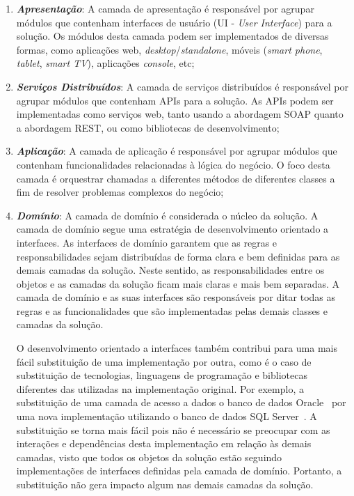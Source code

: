 \begin{enumerate}

  \item
  \textit{\textbf{Apresentação}}: A camada de apresentação é responsável por agrupar módulos que contenham interfaces de usuário (UI - \textit{User Interface}) para a solução. Os módulos desta camada podem ser implementados de diversas formas, como aplicações web, \textit{desktop}/\textit{standalone}, móveis (\textit{smart phone}, \textit{tablet}, \textit{smart TV}), aplicações \textit{console}, etc;
  
  \item
  \textit{\textbf{Serviços Distribuídos}}: A camada de serviços distribuídos é responsável por agrupar módulos que contenham APIs para a solução. As APIs podem ser implementadas como serviços web, tanto usando a abordagem SOAP quanto a abordagem REST, ou como bibliotecas de desenvolvimento;
  
  \item
  \textit{\textbf{Aplicação}}: A camada de aplicação é responsável por agrupar módulos que contenham funcionalidades relacionadas à lógica do negócio. O foco desta camada é orquestrar chamadas a diferentes métodos de diferentes classes a fim de resolver problemas complexos do negócio;
  
  \item
  \textit{\textbf{Domínio}}: A camada de domínio é considerada o núcleo da solução. A camada de domínio segue uma estratégia de desenvolvimento orientado a interfaces. As interfaces de domínio garantem que as regras e responsabilidades sejam distribuídas de forma clara e bem definidas para as demais camadas da solução. Neste sentido, as responsabilidades entre os objetos e as camadas da solução ficam mais claras e mais bem separadas. A camada de domínio e as suas interfaces são responsáveis por ditar todas as regras e as funcionalidades que são implementadas pelas demais classes e camadas da solução.
  
  O desenvolvimento orientado a interfaces também contribui para uma mais fácil substituição de uma implementação por outra, como é o caso de substituição de tecnologias, linguagens de programação e bibliotecas diferentes das utilizadas na implementação original. Por exemplo, a substituição de uma camada de acesso a dados o banco de dados Oracle~\cite{ORACLE-2019} por uma nova implementação utilizando o banco de dados SQL Server~\cite{SQLSERVER-2019}. A substituição se torna mais fácil pois não é necessário se preocupar com as interações e dependências desta implementação em relação às demais camadas, visto que todos os objetos da solução estão seguindo implementações de interfaces definidas pela camada de domínio. Portanto, a substituição não gera impacto algum nas demais camadas da solução.
  

\end{enumerate}
